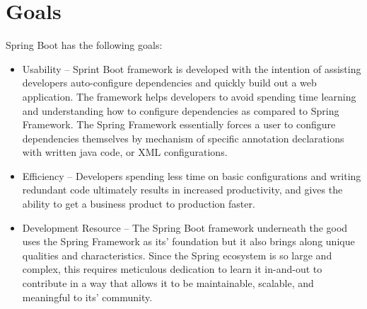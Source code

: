 \section{Goals}

Spring Boot has the following goals:

\begin{itemize}
\item Usability -- Sprint Boot framework is developed with the intention of assisting developers auto-configure dependencies and quickly build out a web application. The framework helps developers to avoid spending time learning and understanding how to configure dependencies as compared to Spring Framework. The Spring Framework essentially forces a user to configure dependencies themselves by mechanism of specific annotation declarations with written java code, or XML configurations.
\item Efficiency -- Developers spending less time on basic configurations and writing redundant code ultimately results in increased productivity, and gives the ability to get a business product to production faster.
\item Development Resource -- The Spring Boot framework underneath the good uses the Spring Framework as its' foundation but it also brings along unique qualities and characteristics. Since the Spring ecosystem is so large and complex, this requires meticulous dedication to learn it in-and-out to contribute in a way that allows it to be maintainable, scalable, and meaningful to its' community.
\end{itemize}

